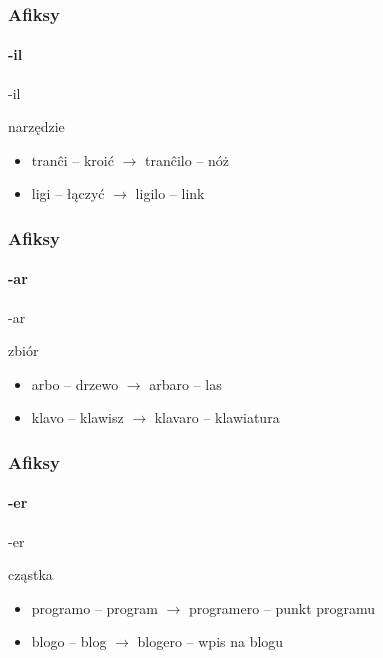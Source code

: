 \documentclass{beamer}
\begin{document}
  \begin{frame}
  	\frametitle{Afiksy}
  	\framesubtitle{-il}
  	  	
  		\begin{block}{-il}
  			\begin{center}
  				narzędzie
  			\end{center}
  		\end{block}
  	
  		\begin{itemize}
  			\item<1-> tranĉi -- kroić $\rightarrow$ tranĉilo -- nóż
  			\item<1-> ligi -- łączyć $\rightarrow$ ligilo -- link
  		\end{itemize}
  \end{frame}

  \begin{frame}
  	\frametitle{Afiksy}
  	\framesubtitle{-ar}
  	  	
  		\begin{block}{-ar}
  			\begin{center}
  				zbiór
  			\end{center}
  		\end{block}
  	
  		\begin{itemize}
  			\item<1-> arbo -- drzewo $\rightarrow$ arbaro -- las
  			\item<1-> klavo -- klawisz $\rightarrow$ klavaro -- klawiatura
  		\end{itemize}
  \end{frame}

  \begin{frame}
  	\frametitle{Afiksy}
  	\framesubtitle{-er}
  	  	
  		\begin{block}{-er}
  			\begin{center}
  			cząstka
  			\end{center}
  		\end{block}
  	
  		\begin{itemize}
			\item<1-> programo -- program $\rightarrow$ programero -- punkt programu
			\item<1-> blogo -- blog $\rightarrow$ blogero -- wpis na blogu
			
  		\end{itemize}
  \end{frame}
\end{document}
